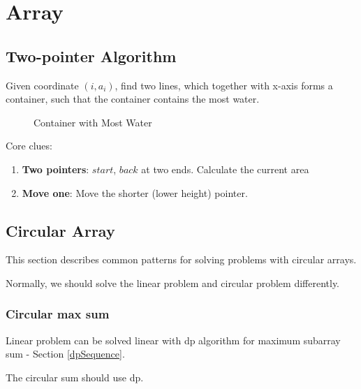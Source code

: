 \chapter{Array}
\section{Two-pointer Algorithm}
 Given coordinate $(i, a_i)$, find two lines, which together with x-axis forms a container, such that the container contains the most water.
\begin{figure}[hbtp]
\centering
{}
\caption{Container with Most Water}
\label{fig:Container-With-Most-Water}
\end{figure}
Core clues:
\begin{enumerate}
\item \textbf{Two pointers}: $start$, $back$ at two ends. Calculate the current area
\item \textbf{Move one}: Move the shorter (lower height) pointer. 
\end{enumerate}

\section{Circular Array}
This section describes common patterns for solving problems with circular arrays.

Normally, we should solve the linear problem and circular problem differently.

\subsection{Circular max sum}
Linear problem can be solved linear with dp algorithm for maximum subarray sum - Section \ref{dpSequence}. 

The circular sum should use dp. 

